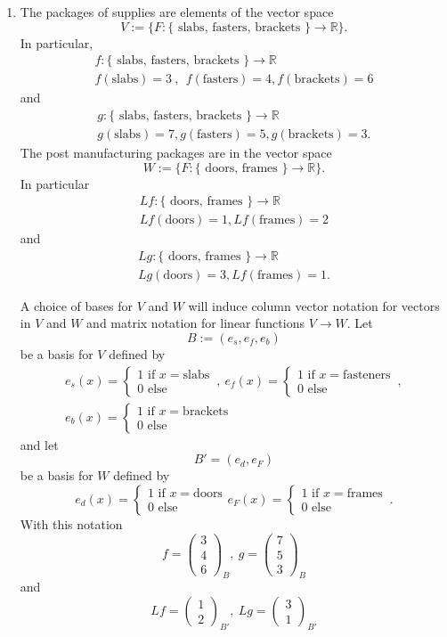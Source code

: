 \documentclass[12pt]{article}
\def\R{{\mathbb{R}}}
\def\bv{\left(\begin{array}{c}}
\def\ev{\end{array}\right) }
\begin{document}
\begin{enumerate}
\begin{enumerate}
\item 
The packages of supplies are elements of the vector space 
\[ V:=\{  F: \{ \text{ slabs, fasters, brackets }\} \to \R \}.\]
In particular, 
\begin{gather*} f: \{ \text{ slabs, fasters, brackets }\} \to \R \\
f(\text{slabs})=3~,~~f(\text{fasters})=4, f(\text{brackets})= 6\end{gather*}
and
\begin{gather*} g: \{ \text{ slabs, fasters, brackets } \} \to \R \\
g(\text{slabs})=7,g(\text{fasters})=5, g(\text{brackets})= 3. \end{gather*}
The post manufacturing packages are  in the vector space 
\[W :=\{ F: \{\text{ doors, frames } \}\to \R\} .\]
In particular
\begin{gather*}Lf:  \{\text{ doors, frames }\} \to \R \\
Lf(\text{doors})=1,Lf(\text{frames})=2 \end{gather*}
and
\begin{gather*}Lg:  \{\text{ doors, frames } \} \to \R \\
Lg(\text{doors})=3,Lf(\text{frames})=1.\end{gather*}

A choice of bases for $V$ and $W$ will induce column vector notation for vectors in $V$ and $W$ and  matrix notation for linear functions $V\to W$. 
Let 
\[B:=( e_s,e_f,e_b)\] 
be a basis for $V$ defined by 
\begin{gather*}
e_s(x)=\left\{ \begin{array}{l} 1 \text{~if~} x=\text{slabs}\\ 0 \text{~else~} \end{array} \right.\, , ~
e_f(x)=\left\{ \begin{array}{l} 1 \text{~if~} x=\text{fasteners}\\ 0 \text{~else~} \end{array} \right.\, , \\
e_b(x)=\left\{ \begin{array}{l} 1 \text{~if~} x=\text{brackets} \\ 0 \text{~else~} \end{array} \right.
\end{gather*}
and let 
\[B'= ( e_d,e_F)\]
be a basis for $W$ defined by
\[
e_d(x)=\left\{ \begin{array}{l} 1 \text{~if~} x=\text{doors}\\ 0 \text{~else~} \end{array}\right.
e_F(x)=\left\{ \begin{array}{l} 1 \text{~if~} x=\text{frames}\\ 0 \text{~else~} \end{array} \right. \, .
\]
With this notation 
\[f= \bv 3\\4\\6 \ev_B ,~g= \bv 7\\5\\3 \ev_B\]
and
\[ Lf=\bv 1\\2\ev _{B'} , ~Lg=\bv3\\1 \ev _{B'}\]


\end{enumerate}
\end{enumerate}
\end{document}
